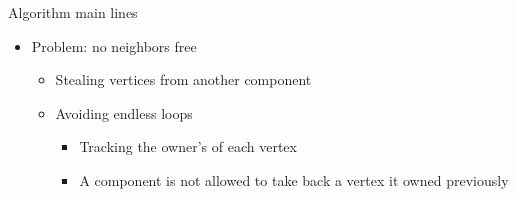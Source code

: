 \begin{frame}{Algorithm main lines}
  \begin{itemize}
  \item Problem: no neighbors free
    \begin{itemize}
    \item Stealing vertices from another component
    \item Avoiding endless loops
      \begin{itemize}
      \item Tracking the owner's of each vertex
      \item A component is not allowed to take back a vertex it owned previously
      \end{itemize}
    \end{itemize}
  \end{itemize}
  \begin{center}
  \end{center}
\end{frame}
